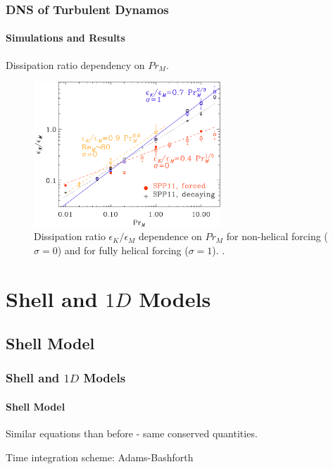 \documentclass{beamer}
\begin{document}
\begin{frame}
 \frametitle{DNS of Turbulent Dynamos}
 \framesubtitle{Simulations and Results}
 
 Dissipation ratio dependency on $Pr_M$.
 
 \begin{figure}[t]
  \includegraphics[width=7cm]{img/dissipation_ratio1}
  \caption{Dissipation ratio $\epsilon_K/\epsilon_M$ dependence on $Pr_M$ for non-helical forcing ($\sigma = 0$) and for fully helical forcing ($\sigma = 1$). \cite{brandenburg2014magnetic}.}
  \centering
 \end{figure}
 
\end{frame}

\section{Shell and $1D$ Models}

\subsection{Shell Model}

\begin{frame}
 \frametitle{Shell and $1D$ Models}
 \framesubtitle{Shell Model}
 
 Similar equations than before - same conserved quantities.
 
 Time integration scheme: Adams-Bashforth
\end{frame}
\end{document}
